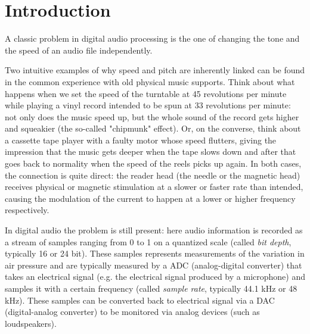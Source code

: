 \documentclass[class=article,crop=false]{standalone}
\begin{document}
\section{Introduction}
A classic problem in digital audio processing is the one of changing the tone and the speed of an audio file independently. 

Two intuitive examples of why speed and pitch are inherently linked can be found in the common experience with old physical music supports. Think about what happens when we set the speed of the turntable at 45 revolutions per minute while playing a vinyl record intended to be spun at 33 revolutions per minute: not only does the music speed up, but the whole sound of the record gets higher and squeakier (the so-called "chipmunk" effect). Or, on the converse, think about a cassette tape player with a faulty motor whose speed flutters, giving the impression that the music gets deeper when the tape slows down and after that goes back to normality when the speed of the reels picks up again. In both cases, the connection is quite direct: the reader head (the needle or the magnetic head) receives physical or magnetic stimulation at a slower or faster rate than intended, causing the modulation of the current to happen at a lower or higher frequency respectively. 

In digital audio the problem is still present: here audio information is recorded as a stream of samples ranging from 0 to 1 on a quantized scale (called \textit{bit depth}, typically 16 or 24 bit). These samples represents measurements of the variation in air pressure and are typically measured by a ADC (analog-digital converter) that takes an electrical signal (e.g. the electrical signal produced by a microphone) and samples it with a certain frequency (called \textit{sample rate}, typically 44.1 kHz or 48 kHz). These samples can be converted back to electrical signal via a DAC (digital-analog converter) to be monitored via analog devices (such as loudspeakers). 
\end{document}
